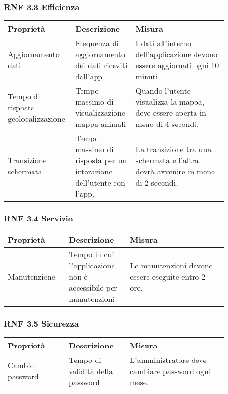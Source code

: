 \subsubsection*{RNF 3.3 Efficienza}
\begin{table}[ht]
    \centering
    \begin{tabular}{| m{0.25\linewidth} | m{0.25\linewidth} | m{0.4\linewidth} |}
        \hline
        \rowcolor{Gray}
        \textbf{Proprietà} & \textbf{Descrizione} & \textbf{Misura} \\
        \hline
        Aggiornamento dati & Frequenza di aggiornamento dei dati riceviti dall'app. & I dati all'interno dell'applicazione devono essere aggiornati ogni 10 minuti .\\
        \hline
        Tempo di risposta geolocalizzazione & Tempo massimo di visualizzazione mappa animali  & Quando l'utente visualizza la mappa, deve essere aperta in meno di 4 secondi. \\
        \hline
       Transizione schermata & Tempo massimo di risposta per un interazione dell'utente con l'app. & La transizione tra una schermata e l'altra dovrà avvenire in meno di 2 secondi. \\
       \hline
    \end{tabular}
\end{table}

\pagebreak
\subsubsection*{RNF 3.4 Servizio}
\begin{table}[ht]
    \centering
    \begin{tabular}{| m{0.25\linewidth} | m{0.25\linewidth} | m{0.4\linewidth} |}
        \hline
        \rowcolor{Gray}
        \textbf{Proprietà} & \textbf{Descrizione} & \textbf{Misura} \\
        \hline
        Manutenzione & Tempo in cui l'applicazione non è accessibile per manutenzioni & Le manutenzioni devono essere eseguite entro 2 ore. \\
        \hline
    \end{tabular}
\end{table}

\subsubsection*{RNF 3.5 Sicurezza}
\begin{table}[ht]
    \centering
    \begin{tabular}{| m{0.25\linewidth} | m{0.25\linewidth} | m{0.4\linewidth} |}
        \hline
        \rowcolor{Gray}
        \textbf{Proprietà} & \textbf{Descrizione} & \textbf{Misura} \\
        \hline
        Cambio password & Tempo di validità della password & L'amministratore deve cambiare password ogni mese. \\
        \hline
    \end{tabular}
\end{table}